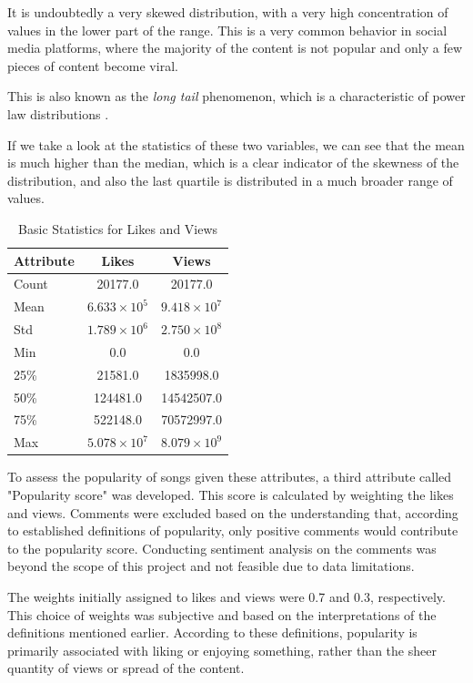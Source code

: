 \documentclass[11pt]{article} %
\begin{document}
It is undoubtedly a very skewed distribution, with a very high concentration of values in the lower part of the range. This is a very common behavior in social media platforms, where the majority of the content is not popular and only a few pieces of content become viral.

This is also known as the \textit{long tail} phenomenon, which is a characteristic of power law distributions \cite{LongTail}.

If we take a look at the statistics of these two variables, we can see that the mean is much higher than the median, which is a clear indicator of the skewness of the distribution, and also the last quartile is distributed in a much broader range of values.

\begin{table}[H]
	\centering
	\begin{tabular}{lcc}
		\toprule
		Attribute & Likes             & Views             \\
		\midrule
		Count     & 20177.0           & 20177.0           \\
		Mean      & $6.633\times10^5$ & $9.418\times10^7$ \\
		Std       & $1.789\times10^6$ & $2.750\times10^8$ \\
		Min       & 0.0               & 0.0               \\
		25\%      & 21581.0           & 1835998.0         \\
		50\%      & 124481.0          & 14542507.0        \\
		75\%      & 522148.0          & 70572997.0        \\
		Max       & $5.078\times10^7$ & $8.079\times10^9$ \\
		\bottomrule
	\end{tabular}
	\caption{Basic Statistics for Likes and Views}
	\label{tab:stats}
\end{table}

To assess the popularity of songs given these attributes, a third attribute called "Popularity score" was developed. This score is calculated by weighting the likes and views. Comments were excluded based on the understanding that, according to established definitions of popularity, only positive comments would contribute to the popularity score. Conducting sentiment analysis on the comments was beyond the scope of this project and not feasible due to data limitations.

The weights initially assigned to likes and views were 0.7 and 0.3, respectively. This choice of weights was subjective and based on the interpretations of the definitions mentioned earlier. According to these definitions, popularity is primarily associated with liking or enjoying something, rather than the sheer quantity of views or spread of the content.
\end{document}
